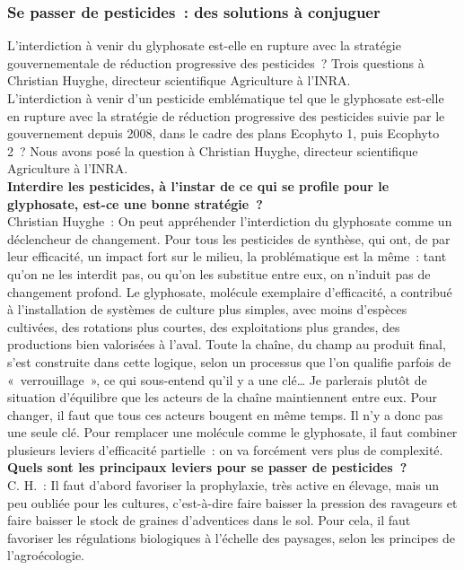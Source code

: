 \documentclass[8pt]{article}
\begin{document}
\subsubsection{  Se passer de pesticides~: des solutions à conjuguer  }
L’interdiction à venir du glyphosate est-elle en rupture avec la stratégie gouvernementale de réduction progressive des pesticides~? Trois questions à Christian Huyghe, directeur scientifique Agriculture à l’INRA.\\

L’interdiction à venir d’un pesticide emblématique tel que le glyphosate est-elle en rupture avec la stratégie de réduction progressive des pesticides suivie par le gouvernement depuis 2008, dans le cadre des plans Ecophyto 1, puis Ecophyto 2~? Nous avons posé la question à Christian Huyghe, directeur scientifique Agriculture à l’INRA.\\

\textbf{Interdire les pesticides, à l’instar de ce qui se profile pour le glyphosate, est-ce une bonne stratégie~?}\\

Christian Huyghe~: On peut appréhender l’interdiction du glyphosate comme un déclencheur de changement. Pour tous les pesticides de synthèse, qui ont, de par leur efficacité, un impact fort sur le milieu, la problématique est la même~: tant qu’on ne les interdit pas, ou qu’on les substitue entre eux, on n’induit pas de changement profond. Le glyphosate, molécule exemplaire d’efficacité, a contribué à l’installation de systèmes de culture plus simples, avec moins d’espèces cultivées, des rotations plus courtes, des exploitations plus grandes, des productions bien valorisées à l’aval. Toute la chaîne, du champ au produit final, s’est construite dans cette logique, selon un processus que l’on qualifie parfois de «~verrouillage~», ce qui sous-entend qu’il y a une clé… Je parlerais plutôt de situation d’équilibre que les acteurs de la chaîne maintiennent entre eux. Pour changer, il faut que tous ces acteurs bougent en même temps. Il n’y a donc pas une seule clé. Pour remplacer une molécule comme le glyphosate, il faut combiner plusieurs leviers d’efficacité partielle~: on va forcément vers plus de complexité.\\

\textbf{Quels sont les principaux leviers pour se passer de pesticides~?}\\

C. H.~: Il faut d’abord favoriser la prophylaxie, très active en élevage, mais un peu oubliée pour les cultures, c’est-à-dire faire baisser la pression des ravageurs et faire baisser le stock de graines d’adventices dans le sol. Pour cela, il faut favoriser les régulations biologiques à l’échelle des paysages, selon les principes de l’agroécologie.\\
\end{document}
